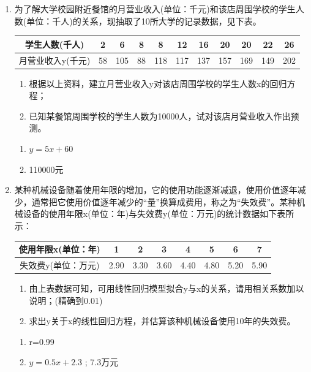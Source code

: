 \begin{enumerate}
\item 为了解大学校园附近餐馆的月营业收入(单位：千元)和该店周围学校的学生人数(单位：千人)的关系，现抽取了10所大学的记录数据，见下表。
\begin{center}
\begin{tabular}{|c|c|c|c|c|c|c|c|c|c|c|}
\hline
学生人数(千人) & 2 & 6 & 8 & 8 & 12 & 16 & 20 & 20 & 22 & 26 \\
\hline
月营业收入y(千元) & 58 & 105 & 88 & 118 & 117 & 137 & 157 & 169 & 149 & 202 \\
\hline
\end{tabular}
\end{center}
\begin{enumerate}
\item 根据以上资料，建立月营业收入y对该店周围学校的学生人数x的回归方程；
\item 已知某餐馆周围学校的学生人数为10000人，试对该店月营业收入作出预测。
\end{enumerate}
\begin{jieda}
    \begin{enumerate}
        \item $y=5x+60$
        \item 110000元
    \end{enumerate}
\end{jieda}

\item 某种机械设备随着使用年限的增加，它的使用功能逐渐减退，使用价值逐年减少，通常把它使用价值逐年减少的“量”换算成费用，称之为“失效费”。某种机械设备的使用年限x(单位：年)与失效费y(单位：万元)的统计数据如下表所示：
\begin{center}
\begin{tabular}{|c|c|c|c|c|c|c|c|}
\hline
使用年限x(单位：年) & 1 & 2 & 3 & 4 & 5 & 6 & 7 \\
\hline
失效费y(单位：万元) & 2.90 & 3.30 & 3.60 & 4.40 & 4.80 & 5.20 & 5.90 \\
\hline
\end{tabular}
\end{center}
\begin{enumerate}
\item 由上表数据可知，可用线性回归模型拟合y与x的关系，请用相关系数加以说明；(精确到0.01)
\item 求出y关于x的线性回归方程，并估算该种机械设备使用10年的失效费。
\end{enumerate}
\begin{jieda}
    \begin{enumerate}
        \item r=0.99
        \item $y=0.5x+2.3$ ; 7.3万元
    \end{enumerate}
\end{jieda}


    
\end{enumerate}


